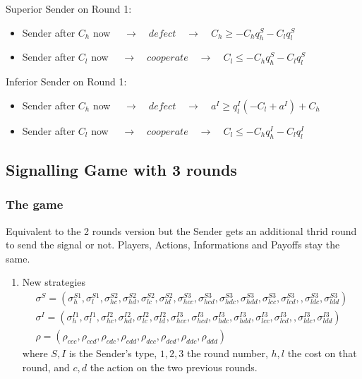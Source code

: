 \documentclass[11pt]{article}
\theoremstyle{plainCl1}
\begin{document}
Superior Sender on Round 1:
\begin{itemize} [noitemsep]
	\item Sender after $C_h$ now $\quad \rightarrow \quad defect \quad \rightarrow \quad  C_h \geq -C_h q^S_h - C_l q^S_l$\\
	\item Sender after $C_l$ now $\quad \rightarrow \quad cooperate \quad \rightarrow \quad  C_l \leq -C_h q^S_h - C_l q^S_l$\\
\end{itemize}
Inferior Sender on Round 1:
\begin{itemize} [noitemsep]
	\item Sender after $C_h$ now $\quad \rightarrow \quad defect \quad \rightarrow \quad a^I \geq q^I_l (-C_l + a^I) + C_h$\\
	\item Sender after $C_l$ now $\quad \rightarrow \quad cooperate \quad \rightarrow \quad C_l \leq -C_h q^I_h - C_l q^I_l$\\
\end{itemize}


\subsection{Signalling Game with 3 rounds}
\subsubsection{The game}

Equivalent to the 2 rounds version but the Sender gets an additional thrid round to send the signal or not. Players, Actions, Informations and Payoffs stay the same. 

\begin{enumerate}[label={(\alph*)}]
\item New strategies
	\begin{equation}\label{strategies3}
	\begin{array}{l}	
	\sigma^S = (\sigma^{S1}_h, \sigma^{S1}_l, \sigma^{S2}_{hc}, \sigma^{S2}_{hd}, \sigma^{S2}_{lc}, \sigma^{S2}_{ld}, 
	\sigma^{S3}_{hcc}, \sigma^{S3}_{hcd}, \sigma^{S3}_{hdc}, \sigma^{S3}_{hdd}, \sigma^{S3}_{lcc}, \sigma^{S3}_{lcd}, , \sigma^{S3}_{ldc}, \sigma^{S3}_{ldd})\\
	\sigma^I = (\sigma^{I1}_h, \sigma^{I1}_l, \sigma^{I2}_{hc}, \sigma^{I2}_{hd}, \sigma^{I2}_{lc}, \sigma^{I2}_{ld}, 
	\sigma^{I3}_{hcc}, \sigma^{I3}_{hcd}, \sigma^{I3}_{hdc}, \sigma^{I3}_{hdd}, \sigma^{I3}_{lcc}, \sigma^{I3}_{lcd}, , \sigma^{I3}_{ldc}, \sigma^{I3}_{ldd})\\
	\rho = (\rho_{ccc}, \rho_{ccd}, \rho_{cdc}, \rho_{cdd}, \rho_{dcc}, \rho_{dcd}, \rho_{ddc}, \rho_{ddd})
	\end{array}
	\end{equation}
	where $S,I$ is the Sender's type, $1,2,3$ the round number, $h,l$ the cost on that round, and $c,d$ the action on the two previous rounds.
\end{enumerate}
\end{document}
